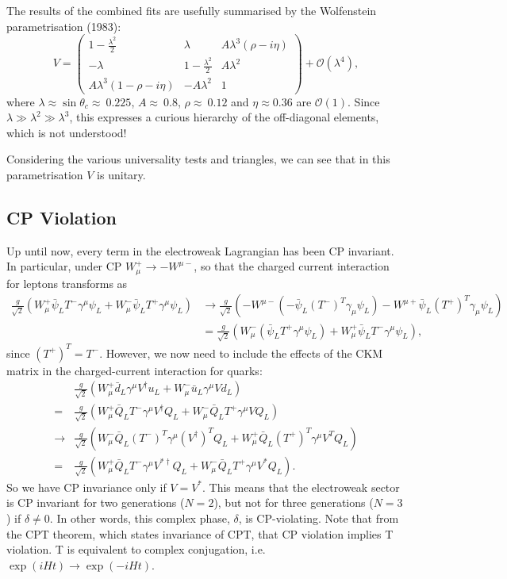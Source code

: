 The results of the combined fits are usefully summarised by the Wolfenstein parametrisation (1983):
\begin{equation}
V = \begin{pmatrix}
1-\frac{\lambda^2}{2} & \lambda & A\lambda^3(\rho - i\eta) \\
-\lambda &  1-\frac{\lambda^2}{2} & A \lambda^2\\
A\lambda^3(1-\rho-i\eta) & -A\lambda^2 & 1 
\end{pmatrix} + \mathcal{O}(\lambda^4),
\end{equation}
where $\lambda \approx \sin\theta_c \approx\ 0.225$, $A \approx\ 0.8$, $\rho \approx\ 0.12$ and $\eta \approx 0.36$ are $\mathcal{O}(1)$. Since $\lambda \gg \lambda^2 \gg \lambda^3$, this expresses a curious hierarchy of the off-diagonal elements, which is not understood! 

Considering the various universality tests and triangles, we can see that in this parametrisation $V$ is unitary.
%
\subsection{CP Violation}
%
Up until now, every term in the electroweak Lagrangian has been CP invariant. In particular, under CP $W_\mu^+ \to - W^{\mu -}$, so that the charged current interaction for leptons transforms as 
\begin{equation}
\begin{split}
\frac{g}{\sqrt{2}}(W_\mu^+\bar{\psi}_LT^-\gamma^\mu \psi_L + W_\mu^-\bar{\psi}_L T^+ \gamma^\mu \psi_L) &\to \frac{g}{\sqrt{2}}(-W^{\mu -}(-\bar{\psi}_L(T^-)^T \gamma_\mu \psi_L) - W^{\mu +}\bar{\psi}_L(T^+)^T \gamma_\mu \psi_L) \\
&= \frac{g}{\sqrt{2}}(W_\mu^- (\bar{\psi}_L T^+ \gamma^\mu \psi_L) + W_\mu^+ \bar{\psi}_L T^- \gamma^\mu \psi_L),
\end{split}
\end{equation}
since $(T^+)^T = T^-$. However, we now need to include the effects of the CKM matrix in the charged-current interaction for quarks:
\begin{equation}
\begin{split}
&\frac{g}{\sqrt{2}}(W_\mu^+\bar{d}_L\gamma^\mu V^\dagger u_L + W_\mu^-\bar{u}_L \gamma^\mu  V d_L)\\
= &\frac{g}{\sqrt{2}}(W_\mu^+\bar{Q}_L T^-\gamma^\mu V^\dagger Q_L + W_\mu^- \bar{Q}_L T^+ \gamma^\mu V Q_L)\\
\to &\frac{g}{\sqrt{2}}(W_\mu^-\bar{Q}_L (T^-)^T\gamma^\mu (V^\dagger)^T Q_L + W_\mu^+ \bar{Q}_L (T^+)^T \gamma^\mu V^T Q_L)\\
= &\frac{g}{\sqrt{2}}(W_\mu^+\bar{Q}_L T^-\gamma^\mu V^{*\dagger} Q_L + W_\mu^- \bar{Q}_L T^+ \gamma^\mu V^* Q_L).
\end{split}
\end{equation}
So we have CP invariance only if $V = V^*$. This means that the electroweak sector is CP invariant for two generations ($N=2$), but not for three generations ($N=3$) if $\delta \neq 0$. In other words, this complex phase, $\delta$, is CP-violating. Note that from the CPT theorem, which states invariance of CPT, that CP violation implies T violation. T is equivalent to complex conjugation, i.e. $\exp(iHt) \to \exp(-iHt)$.

